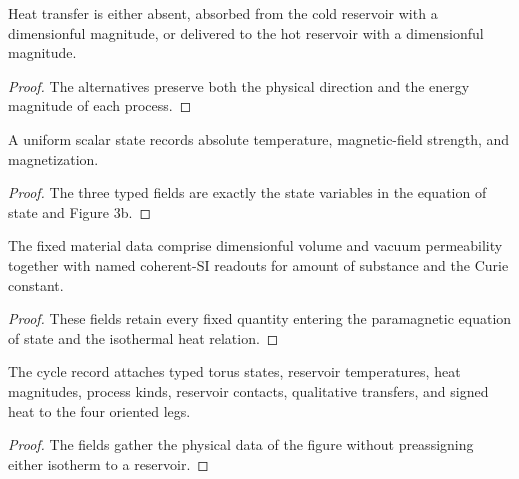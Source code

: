 \begin{definition}
  \label{def:physics:IPhO_2026_3_C_1:aux013}
  Heat transfer is either absent, absorbed from the cold reservoir with a
  dimensionful magnitude, or delivered to the hot reservoir with a
  dimensionful magnitude.
\end{definition}
\begin{proof}
  The alternatives preserve both the physical direction and the energy
  magnitude of each process.
\end{proof}

\begin{definition}
  \label{def:physics:IPhO_2026_3_C_1:aux014}
  A uniform scalar state records absolute temperature, magnetic-field
  strength, and magnetization.
\end{definition}
\begin{proof}
  The three typed fields are exactly the state variables in the equation of
  state and Figure 3b.
\end{proof}

\begin{definition}
  \label{def:physics:IPhO_2026_3_C_1:aux015}
  The fixed material data comprise dimensionful volume and vacuum
  permeability together with named coherent-SI readouts for amount of
  substance and the Curie constant.
\end{definition}
\begin{proof}
  These fields retain every fixed quantity entering the paramagnetic equation
  of state and the isothermal heat relation.
\end{proof}

\begin{definition}
  \label{def:physics:IPhO_2026_3_C_1:aux016}
  The cycle record attaches typed torus states, reservoir temperatures, heat
  magnitudes, process kinds, reservoir contacts, qualitative transfers, and
  signed heat to the four oriented legs.
\end{definition}
\begin{proof}
  The fields gather the physical data of the figure without preassigning
  either isotherm to a reservoir.
\end{proof}

